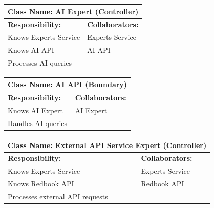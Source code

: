 \documentclass[]{article}
\begin{document}
\begin{itemize}
        \begin{table}[H]
            \centering
            \begin{tabular}{|p{6cm}|p{6cm}|}
            \hline 
             \multicolumn{2}{|l|}{\textbf{Class Name: AI Expert (Controller)}} \\
            \hline
            \textbf{Responsibility:} & \textbf{Collaborators:} \\
            \hline
            Knows Experts Service & Experts Service \\
            Knows AI API & AI API \\
            Processes AI queries & \\
            \hline
            \end{tabular}
        \end{table}     
        \begin{table}[H]
            \centering
            \begin{tabular}{|p{6cm}|p{6cm}|}
            \hline 
             \multicolumn{2}{|l|}{\textbf{Class Name: AI API (Boundary)}} \\
            \hline
            \textbf{Responsibility:} & \textbf{Collaborators:} \\
            \hline
            Knows AI Expert & AI Expert \\
            Handles AI queries & \\
            \hline
            \end{tabular}
        \end{table}
        \begin{table}[H]
            \centering
            \begin{tabular}{|p{6cm}|p{6cm}|}
            \hline 
             \multicolumn{2}{|l|}{\textbf{Class Name: External API Service Expert (Controller)}} \\
            \hline
            \textbf{Responsibility:} & \textbf{Collaborators:} \\
            \hline
            Knows Experts Service & Experts Service \\
            Knows Redbook API & Redbook API \\
            Processes external API requests & \\
            \hline
            \end{tabular}
        \end{table}  
        \begin{table}[H]
            \centering

\end{table}
\end{itemize}
\end{document}
